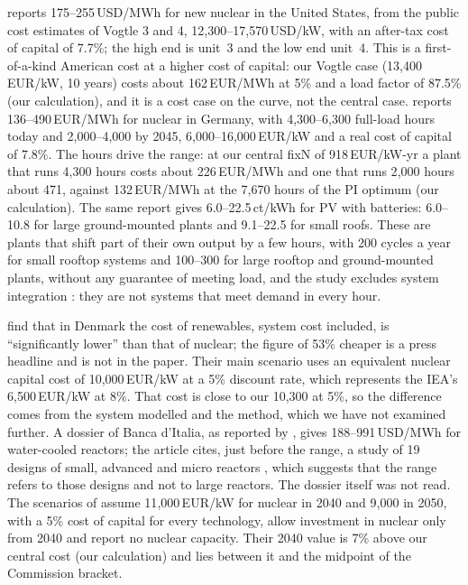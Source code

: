 \citet{Lazard2026} reports 175--255\,USD/MWh for new nuclear in the United States, from the public cost estimates of Vogtle 3 and 4, 12{,}300--17{,}570\,USD/kW, with an after-tax cost of capital of 7.7\%; the high end is unit~3 and the low end unit~4. This is a first-of-a-kind American cost at a higher cost of capital: our Vogtle case (13{,}400\,EUR/kW, 10 years) costs about 162\,EUR/MWh at 5\% and a load factor of 87.5\% (our calculation), and it is a cost case on the curve, not the central case. \citet{FraunhoferEN2024} reports 136--490\,EUR/MWh for nuclear in Germany, with 4{,}300--6{,}300 full-load hours today and 2{,}000--4{,}000 by 2045, 6{,}000--16{,}000\,EUR/kW and a real cost of capital of 7.8\%. The hours drive the range: at our central fixN of 918\,EUR/kW-yr a plant that runs 4{,}300 hours costs about 226\,EUR/MWh and one that runs 2{,}000 hours about 471, against 132\,EUR/MWh at the 7{,}670 hours of the PI optimum (our calculation). The same report gives 6.0--22.5\,ct/kWh for PV with batteries: 6.0--10.8 for large ground-mounted plants and 9.1--22.5 for small roofs. These are plants that shift part of their own output by a few hours, with 200 cycles a year for small rooftop systems and 100--300 for large rooftop and ground-mounted plants, without any guarantee of meeting load, and the study excludes system integration \citep{FraunhoferEN2024}: they are not systems that meet demand in every hour.

\citet{Lund2026} find that in Denmark the cost of renewables, system cost included, is ``significantly lower'' than that of nuclear; the figure of 53\% cheaper is a press headline and is not in the paper. Their main scenario uses an equivalent nuclear capital cost of 10{,}000\,EUR/kW at a 5\% discount rate, which represents the IEA's 6{,}500\,EUR/kW at 8\%. That cost is close to our 10{,}300 at 5\%, so the difference comes from the system modelled and the method, which we have not examined further. A dossier of Banca d'Italia, as reported by \citet{QEBankitalia2025}, gives 188--991\,USD/MWh for water-cooled reactors; the article cites, just before the range, a study of 19 designs of small, advanced and micro reactors \citep{Steigerwald2023}, which suggests that the range refers to those designs and not to large reactors. The dossier itself was not read. The scenarios of \citet{ItaliaSolare2026} assume 11{,}000\,EUR/kW for nuclear in 2040 and 9{,}000 in 2050, with a 5\% cost of capital for every technology, allow investment in nuclear only from 2040 and report no nuclear capacity. Their 2040 value is 7\% above our central cost (our calculation) and lies between it and the midpoint of the Commission bracket.

